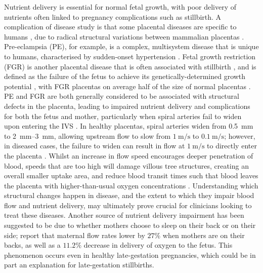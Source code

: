         Nutrient delivery is essential for normal fetal growth, with poor delivery of nutrients often linked to pregnancy complications such as stillbirth. A complication of disease study is that some placental diseases are specific to humans \cite{clarkComplexitiesHumanPlacenta2023}, due to radical structural variations between mammalian placentas \cite{laundonPlacentalEvolutionThreedimensional2024}. Pre-eclampsia (PE), for example, is a complex, multisystem disease that is unique to humans, characterised by sudden-onset hypertension \cite{burtonRheologicalPhysiologicalConsequences2009,dimitriadisPreeclampsia2023}. Fetal growth restriction (FGR) is another placental disease that is often associated with stillbirth \cite{smithStillbirth2007}, and is defined as the failure of the fetus to achieve its genetically-determined growth potential \cite{resnikIntrauterineGrowthRestriction2002}, with FGR placentas on average half of the size of normal placentas \cite{sunPlacentaFetalGrowth2020}. PE and FGR are both generally considered to be associated with structural defects in the placenta, leading to impaired nutrient delivery and complications for both the fetus and mother, particularly when spiral arteries fail to widen upon entering the IVS \cite{burtonPathophysiologyPlacentalderivedFetal2018,dellschaftHaemodynamicsHumanPlacenta2020}. In healthy placentas, spiral arteries widen from \qty{0.5}{\milli\metre} to \qtyrange{2}{3}{\milli\metre}, allowing upstream flow to slow from $\qty{1}{\metre\per\second}$ to $\qty{0.1}{\metre\per\second}$; however, in diseased cases, the failure to widen can result in flow at $\qty{1}{\metre\per\second}$ to directly enter the placenta \cite{burtonRheologicalPhysiologicalConsequences2009}. Whilst an increase in flow speed encourages deeper penetration of blood, speeds that are too high will damage villous tree structures, creating an overall smaller uptake area, and reduce blood transit times such that blood leaves the placenta with higher-than-usual oxygen concentrations \cite{burtonRheologicalPhysiologicalConsequences2009}. Understanding which structural changes happen in disease, and the extent to which they impair blood flow and nutrient delivery, may ultimately prove crucial for clinicians looking to treat these diseases. Another source of nutrient delivery impairment has been suggested to be due to whether mothers choose to sleep on their back or on their side; \citeauthor{couperEffectsMaternalPosition2021} \cite{couperEffectsMaternalPosition2021} report that maternal flow rates lower by $27\%$ when mothers are on their backs, as well as a $11.2\%$ decrease in delivery of oxygen to the fetus. This phenomenon occurs even in healthy late-gestation pregnancies, which could be in part an explanation for late-gestation stillbirths. 

